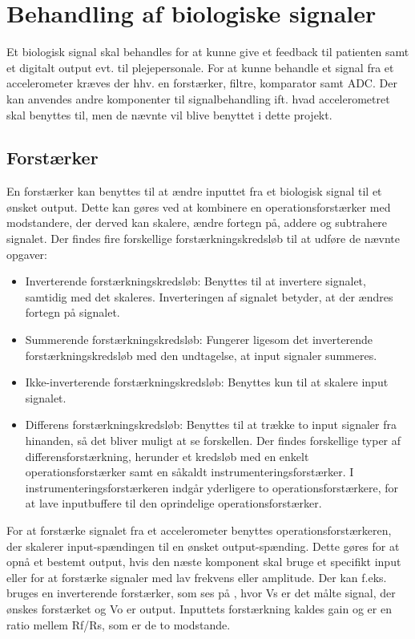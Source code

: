\section{Behandling af biologiske signaler}
Et biologisk signal skal behandles for at kunne give et feedback til patienten samt et digitalt output evt. til plejepersonale. For at kunne behandle et signal fra et accelerometer kræves der hhv. en forstærker, filtre, komparator samt ADC. Der kan anvendes andre komponenter til signalbehandling ift. hvad accelerometret skal benyttes til, men de nævnte vil blive benyttet i dette projekt. 

\subsection{Forstærker}\label{forstaerkerafsnit}
En forstærker kan benyttes til at ændre inputtet fra et biologisk signal til et ønsket output. Dette kan gøres ved at kombinere en operationsforstærker med modstandere, der derved kan skalere, ændre fortegn på, addere og subtrahere signalet. Der findes fire forskellige forstærkningskredsløb til at udføre de nævnte opgaver: \cite{Nilsson2011}
\begin{itemize}
\item Inverterende forstærkningskredsløb: Benyttes til at invertere signalet, samtidig med det skaleres. Inverteringen af signalet betyder, at der ændres fortegn på signalet.
\item Summerende forstærkningskredsløb: Fungerer ligesom det inverterende forstærkningskredsløb med den undtagelse, at input signaler summeres.
\item Ikke-inverterende forstærkningskredsløb: Benyttes kun til at skalere input signalet.
\item Differens forstærkningskredsløb: Benyttes til at trække to input signaler fra hinanden, så det bliver muligt at se forskellen\cite{Nilsson2011}. Der findes forskellige typer af differensforstærkning, herunder et kredsløb med en enkelt operationsforstærker samt en såkaldt instrumenteringsforstærker. I instrumenteringsforstærkeren indgår yderligere to operationsforstærkere, for at lave inputbuffere til den oprindelige operationsforstærker.  
\end{itemize} 

For at forstærke signalet fra et accelerometer benyttes operationsforstærkeren, der skalerer input-spændingen til en ønsket output-spænding. Dette gøres for at opnå et bestemt output, hvis den næste komponent skal bruge et specifikt input eller for at forstærke signaler med lav frekvens eller amplitude. Der kan f.eks. bruges en inverterende forstærker, som ses på , hvor Vs er det målte signal, der ønskes forstærket og Vo er output. Inputtets forstærkning kaldes gain og er en ratio mellem Rf/Rs, som er de to modstande. \cite{Nilsson2011}

